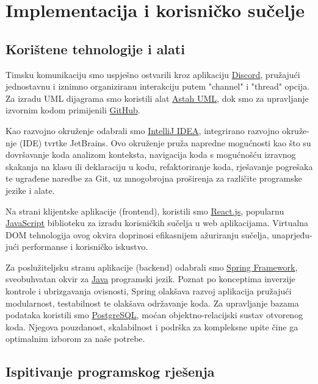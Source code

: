 
\chapter{Implementacija i korisničko sučelje}

	
		
		\section{Korištene tehnologije i alati}

        Timsku komunikaciju smo uspješno ostvarili kroz aplikaciju \href{https://discord.com/}{Discord}, pružajući jednostavnu i iznimno organiziranu interakciju putem "channel" i "thread" opcija. Za izradu UML dijagrama smo koristili alat \href{https://astah.net/products/astah-uml/}{Astah UML}, dok smo za upravljanje izvornim kodom primijenili \href{https://github.com/}{GitHub}.

        Kao razvojno okruženje odabrali smo \href{https://www.jetbrains.com/idea/}{IntelliJ IDEA}, integrirano razvojno okruže- nje (IDE) tvrtke JetBrains. Ovo okruženje pruža napredne mogućnosti kao što su dovršavanje koda analizom konteksta, navigacija koda s mogućnošću izravnog skakanja na klasu ili deklaraciju u kodu, refaktoriranje koda, rješavanje pogrešaka te ugrađene naredbe za Git, uz mnogobrojna proširenja za različite programske jezike i alate.

        Na strani klijentske aplikacije (frontend), koristili smo \href{https://reactjs.org/}{React.js}, popularnu \href{https://www.javascript.com/}{JavaScript} biblioteku za izradu korisničkih sučelja u web aplikacijama. Virtualna DOM tehnologija ovog okvira doprinosi efikasnijem ažuriranju sučelja, unaprjeđu- jući performanse i korisničko iskustvo.

        Za poslužiteljsku stranu aplikacije (backend) odabrali smo \href{https://spring.io/}{Spring Framework}, sveobuhvatan okvir za \href{https://www.java.com/en/}{Java} programski jezik. Poznat po konceptima inverzije kontrole i ubrizgavanja ovisnosti, Spring olakšava razvoj aplikacija pružajući modularnost, testabilnost te olakšava održavanje koda. Za upravljanje bazama podataka koristili smo \href{https://www.postgresql.org/}{PostgreSQL}, moćan objektno-relacijski sustav otvorenog koda. Njegova pouzdanost, skalabilnost i podrška za kompleksne upite čine ga optimalnim izborom za naše potrebe.
			
			\eject
		
	
		\section{Ispitivanje programskog rješenja}
			

